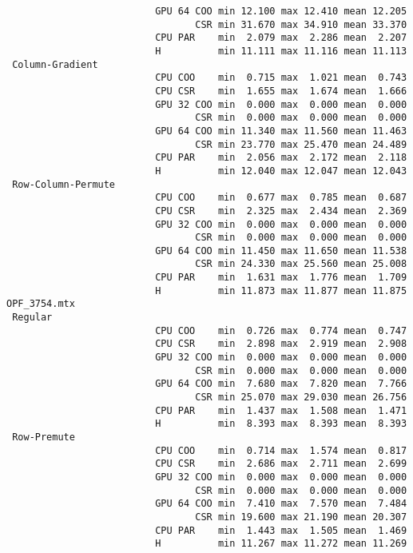 \begin{verbatim}
                          GPU 64 COO min 12.100 max 12.410 mean 12.205
                                 CSR min 31.670 max 34.910 mean 33.370
                          CPU PAR    min  2.079 max  2.286 mean  2.207
                          H          min 11.111 max 11.116 mean 11.113
 Column-Gradient
                          CPU COO    min  0.715 max  1.021 mean  0.743
                          CPU CSR    min  1.655 max  1.674 mean  1.666
                          GPU 32 COO min  0.000 max  0.000 mean  0.000
                                 CSR min  0.000 max  0.000 mean  0.000
                          GPU 64 COO min 11.340 max 11.560 mean 11.463
                                 CSR min 23.770 max 25.470 mean 24.489
                          CPU PAR    min  2.056 max  2.172 mean  2.118
                          H          min 12.040 max 12.047 mean 12.043
 Row-Column-Permute
                          CPU COO    min  0.677 max  0.785 mean  0.687
                          CPU CSR    min  2.325 max  2.434 mean  2.369
                          GPU 32 COO min  0.000 max  0.000 mean  0.000
                                 CSR min  0.000 max  0.000 mean  0.000
                          GPU 64 COO min 11.450 max 11.650 mean 11.538
                                 CSR min 24.330 max 25.560 mean 25.008
                          CPU PAR    min  1.631 max  1.776 mean  1.709
                          H          min 11.873 max 11.877 mean 11.875
OPF_3754.mtx
 Regular
                          CPU COO    min  0.726 max  0.774 mean  0.747
                          CPU CSR    min  2.898 max  2.919 mean  2.908
                          GPU 32 COO min  0.000 max  0.000 mean  0.000
                                 CSR min  0.000 max  0.000 mean  0.000
                          GPU 64 COO min  7.680 max  7.820 mean  7.766
                                 CSR min 25.070 max 29.030 mean 26.756
                          CPU PAR    min  1.437 max  1.508 mean  1.471
                          H          min  8.393 max  8.393 mean  8.393
 Row-Premute
                          CPU COO    min  0.714 max  1.574 mean  0.817
                          CPU CSR    min  2.686 max  2.711 mean  2.699
                          GPU 32 COO min  0.000 max  0.000 mean  0.000
                                 CSR min  0.000 max  0.000 mean  0.000
                          GPU 64 COO min  7.410 max  7.570 mean  7.484
                                 CSR min 19.600 max 21.190 mean 20.307
                          CPU PAR    min  1.443 max  1.505 mean  1.469
                          H          min 11.267 max 11.272 mean 11.269

\end{verbatim}
